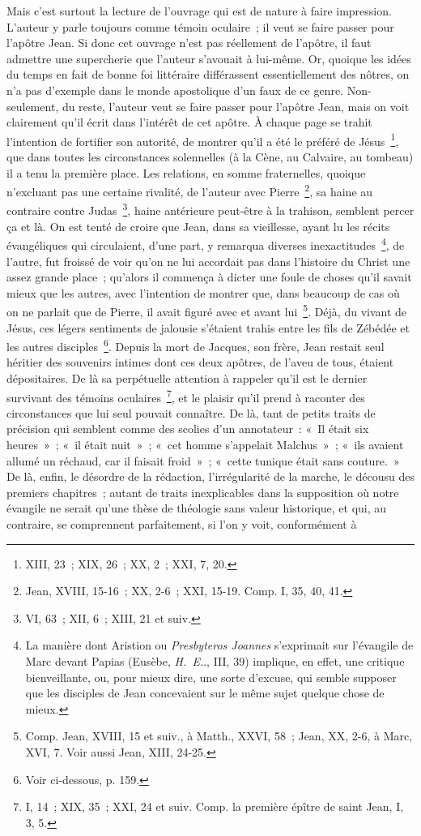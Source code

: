 \documentclass[french,twoside]{book} %
\begin{document}
Mais c’est surtout la lecture de l’ouvrage qui est de nature à faire impression. L’auteur y parle toujours comme témoin oculaire ; il veut se faire passer pour l’apôtre Jean. Si donc cet ouvrage n’est pas réellement de l’apôtre, il faut admettre une supercherie que l’auteur s’avouait à lui-même. Or, quoique les idées du temps en fait de bonne foi littéraire différassent essentiellement des nôtres, on n’a pas d’exemple dans le monde apostolique d’un faux de ce genre. Non-seulement, du reste, l’auteur veut se faire passer pour l’apôtre Jean, mais on voit clairement qu’il écrit dans l’intérêt de cet apôtre. À chaque page se trahit l’intention de fortifier son autorité, de montrer qu’il a été le préféré de Jésus \footnote{XIII, 23 ; XIX, 26 ; XX, 2 ; XXI, 7, 20.}, que dans toutes les circonstances solennelles (à la Cène, au Calvaire, au tombeau) il a tenu la première place. Les relations, en somme fraternelles, quoique n’excluant pas une certaine rivalité, de l’auteur avec Pierre \footnote{Jean, XVIII, 15-16 ; XX, 2-6 ; XXI, 15-19. Comp. I, 35, 40, 41.}, sa haine au contraire contre Judas \footnote{VI, 63 ; XII, 6 ; XIII, 21 et suiv.}, haine antérieure peut-être à la trahison, semblent percer ça et là. On est tenté de croire que Jean, dans sa vieillesse, ayant lu les récits évangéliques qui circulaient, d’une part, y remarqua diverses inexactitudes \footnote{ La manière dont Aristion ou {\itshape Presbyteros Joannes} s’exprimait sur l’évangile de Marc devant Papias (Eusèbe, {\itshape H. E.}., III, 39) implique, en effet, une critique bienveillante, ou, pour mieux dire, une sorte d’excuse, qui semble supposer que les disciples de Jean concevaient sur le même sujet quelque chose de mieux.}, de l’autre, fut froissé de voir qu’on ne lui accordait pas dans l’histoire du Christ une assez grande place ; qu’alors il commença à dicter une foule de choses qu’il savait mieux que les autres, avec l’intention de montrer que, dans beaucoup de cas où on ne parlait que de Pierre, il avait figuré avec et avant lui \footnote{Comp. Jean, XVIII, 15 et suiv., à Matth., XXVI, 58 ; Jean, XX, 2-6, à Marc, XVI, 7. Voir aussi Jean, XIII, 24-25.}. Déjà, du vivant de Jésus, ces légers sentiments de jalousie s’étaient trahis entre les fils de Zébédée et les autres disciples \footnote{Voir ci-dessous, p. 159.}. Depuis la mort de Jacques, son frère, Jean restait seul héritier des souvenirs intimes dont ces deux apôtres, de l’aveu de tous, étaient dépositaires. De là sa perpétuelle attention à rappeler qu’il est le dernier survivant des témoins oculaires \footnote{I, 14 ; XIX, 35 ; XXI, 24 et suiv. Comp. la première épître de saint Jean, I, 3, 5.}, et le plaisir qu’il prend à raconter des circonstances que lui seul pouvait connaître. De là, tant de petits traits de précision qui semblent comme des scolies d’un annotateur : « Il était six heures » ; « il était nuit » ; « cet homme s’appelait Malchus » ; « ils avaient allumé un réchaud, car il faisait froid » ; « cette tunique était sans couture. » De là, enfin, le désordre de la rédaction, l’irrégularité de la marche, le décousu des premiers chapitres ; autant de traits inexplicables dans la supposition où notre évangile ne serait qu’une thèse de théologie sans valeur historique, et qui, au contraire, se comprennent parfaitement, si l’on y voit, conformément à 
\end{document}
